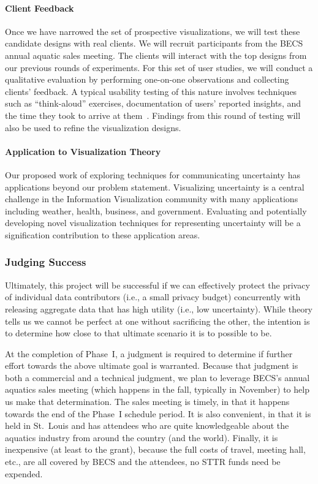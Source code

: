 \paragraph{Client Feedback}
Once we have narrowed the set of prospective visualizations, we will test these candidate designs with real clients. 
We will recruit participants from the BECS annual aquatic sales meeting.   
The clients will interact with the top designs from our previous rounds of experiments. 
For this set of user studies, we will conduct a qualitative evaluation by performing one-on-one observations and collecting clients' feedback.
A typical usability testing of this nature involves techniques such as “think-aloud” exercises, documentation of users’ reported insights, and the time they took to arrive at them~\cite{charlton2001handbook,hix1993developing,lewis1982using}. Findings from this round of testing will also be used to refine the visualization designs.

\paragraph{Application to Visualization Theory} 
Our proposed work of exploring techniques for communicating uncertainty has applications beyond our problem statement. Visualizing uncertainty is a central challenge in the Information Visualization community with many applications including weather, health, business, and government. Evaluating and potentially developing novel visualization techniques for representing uncertainty will be a signification contribution to these application areas.  


\subsubsection{Judging Success}

Ultimately, this project will be successful if we can effectively
protect the privacy of individual data contributors (i.e., a small
privacy budget) concurrently with releasing aggregate data that has
high utility (i.e., low uncertainty).  While theory tells us we cannot
be perfect at one without sacrificing the other, the intention
is to determine how close to that ultimate scenario it is to possible to be.

At the completion of Phase~I, a judgment is required to determine if
further effort towards the above ultimate goal is warranted.
Because that judgment is both a commercial and a technical judgment, we
plan to leverage BECS's annual aquatics sales meeting (which happens in
the fall, typically in November) to help us make that determination.
The sales meeting is timely, in that it happens towards the end of
the Phase~I schedule period.  It is also convenient, in that it is held
in St.~Louis and has attendees who are quite knowledgeable about 
the aquatics industry from around the country (and the world).
Finally, it is inexpensive (at least to the grant), because the full
costs of travel, meeting hall, etc., are all covered by BECS and
the attendees, no STTR funds need be expended.

